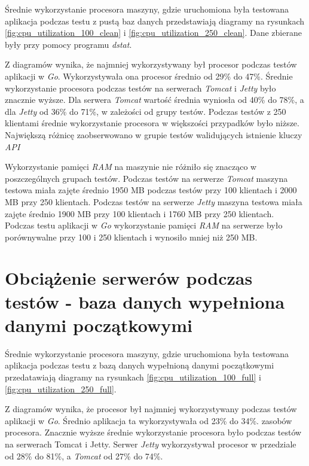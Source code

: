 Średnie wykorzystanie procesora maszyny, gdzie uruchomiona była testowana aplikacja podczas testu z pustą baz danych przedstawiają diagramy na rysunkach \ref{fig:cpu_utilization_100_clean} i \ref{fig:cpu_utilization_250_clean}. Dane zbierane były przy pomocy programu \textsl{dstat}.

Z diagramów wynika, że najmniej wykorzystywany był procesor  podczas testów aplikacji w \textsl{Go}. Wykorzystywała ona procesor średnio od 29\% do 47\%. Średnie wykorzystanie procesora podczas testów na serwerach \textsl{Tomcat} i \textsl{Jetty} było znacznie wyższe. Dla serwera \textsl{Tomcat} wartość średnia wyniosła od 40\% do 78\%, a dla  \textsl{Jetty} od 36\% do 71\%,  w zależości od grupy testów. Podczas testów z 250 klientami średnie wykorzystanie procesora w większości przypadków było niższe. Największą różnicę zaobserwowano w grupie testów walidujących istnienie kluczy \textsl{API}

 Wykorzystanie pamięci \textsl{RAM} na maszynie nie różniło się  znacząco  w poszczególnych grupach testów. Podczas testów na serwerze \textsl{Tomcat} maszyna testowa miała  zajęte średnio 1950 MB podczas testów  przy 100 klientach i 2000 MB przy 250 klientach. Podczas testów na serwerze \textsl{Jetty} maszyna testowa miała zajęte średnio 1900 MB przy 100 klientach  i 1760 MB przy 250 klientach. Podczas testu aplikacji w \textsl{Go} wykorzystanie pamięci \textsl{RAM} na serwerze było porównywalne przy 100 i 250 klientach i wynosiło mniej niż 250 MB. 



\section{Obciążenie serwerów podczas testów - baza danych wypełniona danymi początkowymi}

Średnie wykorzystanie procesora maszyny, gdzie uruchomiona była testowana aplikacja podczas testu z bazą danych wypełnioną danymi początkowymi przedatawiają diagramy 
na rysunkach \ref{fig:cpu_utilization_100_full} i \ref{fig:cpu_utilization_250_full}. 

Z diagramów wynika, że procesor był najmniej wykorzystywany podczas testów aplikacji w \textsl{Go}. Średnio aplikacja ta  wykorzystywała od 23\% do 34\%. zasobów procesora. Znacznie wyższe średnie wykorzystanie procesora było podczas testów na serwerach Tomcat i Jetty. Serwer \textsl{Jetty} wykorzystywał procesor w przedziale od 28\% do 81\%, a \textsl{Tomcat} od 27\% do 74\%.


